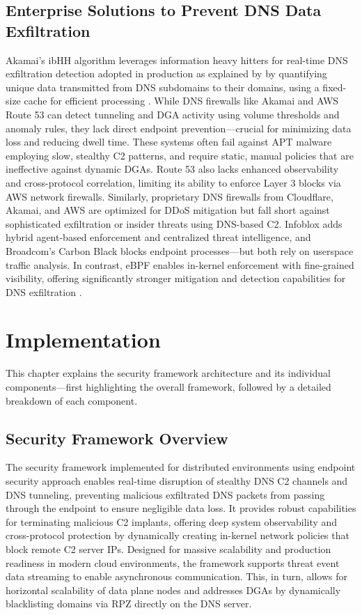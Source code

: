 \documentclass [11pt, proquest] {uwthesis}[2020/02/24]
\begin{document}
\section{Enterprise Solutions to Prevent DNS Data Exfiltration}
Akamai’s ibHH algorithm leverages information heavy hitters for real-time DNS exfiltration detection adopted in production as explained by \citeauthor{ozery2023information} by quantifying unique data transmitted from DNS subdomains to their domains, using a fixed-size cache for efficient processing \cite{ozery2023information}. While DNS firewalls like Akamai and AWS Route 53 can detect tunneling and DGA activity using volume thresholds and anomaly rules, they lack direct endpoint prevention—crucial for minimizing data loss and reducing dwell time. These systems often fail against APT malware employing slow, stealthy C2 patterns, and require static, manual policies that are ineffective against dynamic DGAs. Route 53 also lacks enhanced observability and cross-protocol correlation, limiting its ability to enforce Layer 3 blocks via AWS network firewalls. Similarly, proprietary DNS firewalls from Cloudflare, Akamai, and AWS are optimized for DDoS mitigation but fall short against sophisticated exfiltration or insider threats using DNS-based C2. Infoblox adds hybrid agent-based enforcement and centralized threat intelligence, and Broadcom’s Carbon Black blocks endpoint processes—but both rely on userspace traffic analysis. In contrast, eBPF enables in-kernel enforcement with fine-grained visibility, offering significantly stronger mitigation and detection capabilities for DNS exfiltration \cite{ahmed2019monitoring}.


\chapter{Implementation}
This chapter explains the security framework architecture and its individual components—first highlighting the overall framework, followed by a detailed breakdown of each component.
\section{Security Framework Overview}
The security framework implemented for distributed environments using endpoint security approach enables real-time disruption of stealthy DNS C2 channels and DNS tunneling, preventing malicious exfiltrated DNS packets from passing through the endpoint to ensure negligible data loss. It provides robust capabilities for terminating malicious C2 implants, offering deep system observability and cross-protocol protection by dynamically creating in-kernel network policies that block remote C2 server IPs. Designed for massive scalability and production readiness in modern cloud environments, the framework supports threat event data streaming to enable asynchronous communication. This, in turn, allows for horizontal scalability of data plane nodes and addresses DGAs by dynamically blacklisting domains via RPZ directly on the DNS server. 
\end{document}
